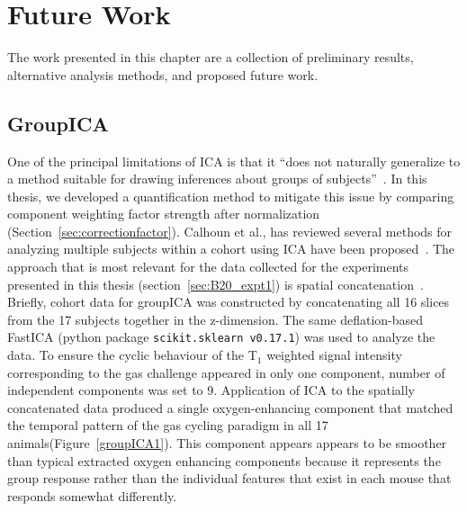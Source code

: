 
\chapter{Future Work}
\label{ch:futurework}

The work presented in this chapter are a collection of preliminary results, alternative analysis methods, and proposed future work. 

\section{GroupICA}

One of the principal limitations of \acs{ICA} is that it ``does not naturally generalize to a method suitable for drawing inferences about groups of subjects''~\cite{Calhoun:2009jr}.
In this thesis, we developed a quantification method to mitigate this issue by comparing component weighting factor strength after normalization (Section~\ref{sec:correctionfactor}).
Calhoun et al., has reviewed several methods for analyzing multiple subjects within a cohort using \acs{ICA} have been proposed~\cite{Calhoun:2009jr}.
The approach that is most relevant for the data collected for the experiments presented in this thesis (section~\ref{sec:B20_expt1}) is spatial concatenation~\cite{Calhoun:2001jx}.
Briefly, cohort data for groupICA was constructed by concatenating all 16 slices from the 17 subjects together in the z-dimension.
The same deflation-based \acs{FastICA} (python package \texttt{scikit.sklearn v0.17.1}) was used to analyze the data.
To ensure the cyclic behaviour of the T$_1$ weighted signal intensity corresponding to the gas challenge appeared in only one component, number of independent components was set to 9.
Application of \acs{ICA} to the spatially concatenated data produced a single oxygen-enhancing component that matched the temporal pattern of the gas cycling paradigm in all 17 animals(Figure~\ref{groupICA1}). 
This component appears appears to be smoother than typical extracted oxygen enhancing components because it represents the group response rather than the individual features that exist in each mouse that responds somewhat differently.

